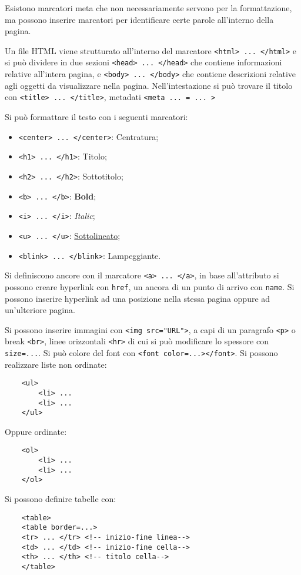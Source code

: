 \documentclass{article}
\numberwithin{equation}{subsection}
\begin{document}
Esistono marcatori meta che non necessariamente servono per la formattazione, ma possono inserire marcatori per identificare certe parole all'interno della pagina. 

Un file \textcolor{Peach}{HTML} viene strutturato all'interno del marcatore \verb|<html> ... </html>| e si può dividere in due sezioni \verb|<head> ... </head>| che contiene informazioni relative all'intera pagina, 
e \verb|<body> ... </body>| che contiene descrizioni relative agli oggetti da visualizzare nella pagina. 
Nell'intestazione si può trovare il titolo con \verb|<title> ... </title>|, metadati \verb|<meta ... = ... >|

Si può formattare il testo con i seguenti marcatori:
\begin{itemize}
    \item \verb|<center> ... </center>|: Centratura;
    \item \verb|<h1> ... </h1>|: Titolo;
    \item \verb|<h2> ... </h2>|: Sottotitolo;
    \item \verb|<b> ... </b>|: \textbf{Bold};
    \item \verb|<i> ... </i>|: \textit{Italic};
    \item \verb|<u> ... </u>|: \underline{Sottolineato};
    \item \verb|<blink> ... </blink>|: Lampeggiante. 
\end{itemize}


Si definiscono ancore con il marcatore \verb|<a> ... </a>|, in base all'attributo si possono creare hyperlink con \verb|href|, un ancora di un punto di arrivo con \verb|name|. 
Si possono inserire hyperlink ad una posizione nella stessa pagina oppure ad un'ulteriore pagina. 

Si possono inserire immagini con \verb|<img src="URL">|, a capi di un paragrafo \verb|<p>| o break \verb|<br>|, linee orizzontali \verb|<hr>| di cui si può modificare 
lo spessore con \verb|size=...|. Si può colore del font con \verb|<font color=...></font>|. 
Si possono realizzare liste non ordinate:
\begin{verbatim}
    <ul>
        <li> ...
        <li> ...
    </ul>
\end{verbatim}
Oppure ordinate:
\begin{verbatim}
    <ol>
        <li> ...
        <li> ...
    </ol>
\end{verbatim}

Si possono definire tabelle con:
\begin{verbatim}
    <table>
    <table border=...>
    <tr> ... </tr> <!-- inizio-fine linea-->
    <td> ... </td> <!-- inizio-fine cella-->
    <th> ... </th> <!-- titolo cella-->
    </table>
\end{verbatim}
\end{document}
